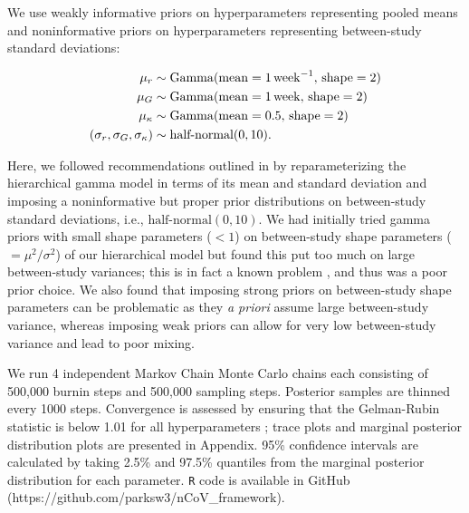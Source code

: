 \documentclass[12pt]{article}
\begin{document}
We use weakly informative priors on hyperparameters representing pooled means and noninformative priors on hyperparameters representing between-study standard deviations:
\begin{linenomath*}
\begin{equation}
\begin{aligned}
\mu_r &\sim \mathrm{Gamma}(\mathrm{mean}=1\,\mathrm{week}^{-1},\,\mathrm{shape}=2)\\
\mu_G &\sim \mathrm{Gamma}(\mathrm{mean}=1\,\mathrm{week},\,\mathrm{shape}=2)\\
\mu_\kappa &\sim \mathrm{Gamma}(\mathrm{mean}=0.5,\,\mathrm{shape}=2)\\
(\sigma_r, \sigma_G, \sigma_\kappa) &\sim \textrm{half-normal}(0, 10).
\end{aligned}
\end{equation}
\end{linenomath*}
Here, we followed recommendations outlined in \cite{gelman2006prior} by reparameterizing the hierarchical gamma model in terms of its mean and standard deviation and imposing a noninformative but proper prior distributions on between-study standard deviations, i.e., $\textrm{half-normal}(0, 10)$.
We had initially tried gamma priors with small shape parameters ($< 1$) on between-study shape parameters ($=\mu^2/\sigma^2$) of our hierarchical model but found this put too much on large between-study variances; this is in fact a known problem \citep{gelman2006prior}, and thus was a poor prior choice.
We also found that imposing strong priors on between-study shape parameters can be problematic as they \textit{a priori} assume large between-study variance, whereas imposing weak priors can allow for very low between-study variance and lead to poor mixing.

We run 4 independent Markov Chain Monte Carlo chains each consisting of 500,000 burnin steps and 500,000 sampling steps.
Posterior samples are thinned every 1000 steps.
Convergence is assessed by ensuring that the Gelman-Rubin statistic is below 1.01 for all hyperparameters \citep{gelman1992inference};
trace plots and marginal posterior distribution plots are presented in Appendix.
95\% confidence intervals are calculated by taking 2.5\% and 97.5\% quantiles from the marginal posterior distribution for each parameter.
\texttt{R} code is available in GitHub (https://github.com/parksw3/nCoV\_framework).

\pagebreak



\pagebreak
\appendix
\renewcommand\thefigure{A\arabic{figure}}
\setcounter{figure}{0}    
\end{document}
